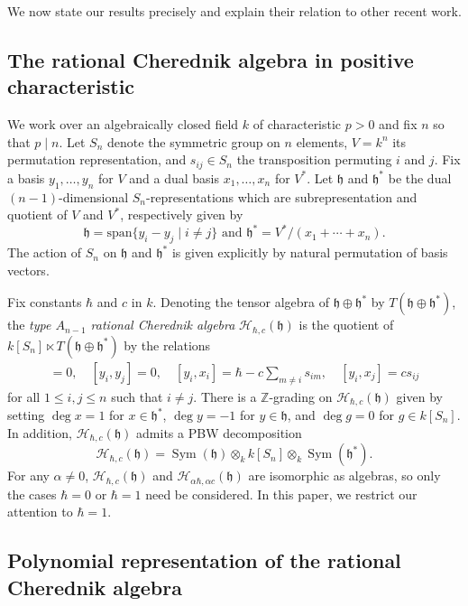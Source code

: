 \documentclass{amsart}
\numberwithin{equation}{section}
\theoremstyle{definition}
\newcommand{\ZZ}{\mathbb{Z}}
\newcommand{\h}{\mathfrak{h}}
\newcommand{\HH}{\mathcal{H}}
\newcommand{\Sym}{\operatorname{Sym}}
\newcommand{\sspan}{\text{span}}
\begin{document}
We now state our results precisely and explain their relation to other recent work.

\subsection{The rational Cherednik algebra in positive characteristic}

We work over an algebraically closed field $k$ of characteristic $p > 0$ and fix $n$ so that $p \mid n$.  Let $S_n$ denote the symmetric group on $n$ elements, $V = k^n$ its permutation representation, and $s_{ij} \in S_n$ the transposition permuting $i$ and $j$.  Fix a basis $y_1,\ldots,y_{n}$ for $V$ and a dual basis $x_1, \ldots, x_{n}$ for $V^*$.  Let $\h$ and $\h^*$ be the dual $(n - 1)$-dimensional $S_n$-representations which are subrepresentation and quotient of $V$ and $V^*$, respectively given by
\[
\h = \sspan\{y_i - y_j \mid i \neq j\} \text{ and } \h^* = V^*/(x_1 + \cdots + x_{n}).
\]
The action of $S_n$ on $\h$ and $\h^*$ is given explicitly by natural permutation of basis vectors.

Fix constants $\hbar$ and $c$ in $k$.  Denoting the tensor algebra of $\h \oplus \h^*$ by $T(\h \oplus \h^*)$, the \textit{type $A_{n - 1}$ rational Cherednik algebra} $\HH_{\hbar, c}(\h)$ is the quotient of $k[S_n] \ltimes T(\h \oplus \h^*)$ by the relations
\begin{align*}
[x_i,x_j]=0, \quad [y_i,y_j] = 0, \quad [y_i,x_i] = \hbar- c \sum_{m \ne i} s_{im},\quad [y_i,x_j] =cs_{ij}\end{align*}
for all $1 \le i , j \le n$ such that $i \neq j$.  There is a $\ZZ$-grading on $\HH_{\hbar,c}(\h)$ given by setting $\deg x=1$ for $x \in \h^*$, $\deg y = -1$ for $y \in \h$, and $\deg g=0$ for $g \in k[S_n]$.  In addition, $\HH_{\hbar, c}(\h)$ admits a PBW decomposition 
\[
\HH_{\hbar,c}(\h) = \Sym(\h) \otimes_k k[S_n] \otimes_k \Sym(\h^*).
\]
For any $\alpha \ne 0$, $\HH_{\hbar,c}(\h)$ and $\HH_{\alpha\hbar,\alpha c}(\h)$ are isomorphic as algebras, so only the cases $\hbar = 0$ or $\hbar = 1$ need be considered.  In this paper, we restrict our attention to $\hbar = 1$.

\subsection{Polynomial representation of the rational Cherednik algebra}
\end{document}
